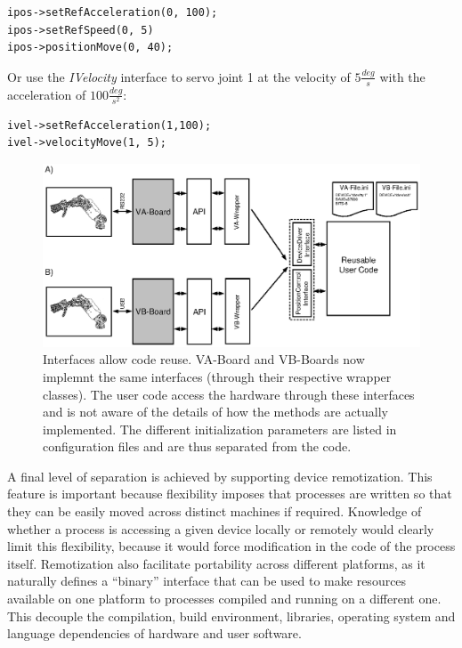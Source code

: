 \begin{verbatim}
ipos->setRefAcceleration(0, 100);
ipos->setRefSpeed(0, 5)
ipos->positionMove(0, 40);
\end{verbatim}

Or use the \emph{IVelocity} interface to servo joint 1 at the velocity of 
$5\frac{deg}{s}$ with the acceleration of $100\frac{deg}{s^2}$:

\begin{verbatim}
ivel->setRefAcceleration(1,100);
ivel->velocityMove(1, 5);
\end{verbatim}

\begin{figure}[tbp]
\centerline{
\includegraphics[width=24cm]{fig-devices2.eps}
}
\caption{Interfaces allow code reuse. VA-Board and VB-Boards now implemnt
the same interfaces (through their respective wrapper classes). The user 
code access the hardware through these interfaces and is not aware of 
the details of how the methods are actually implemented. The different 
initialization parameters are listed in configuration files and are thus 
separated from the code.}\label{fig:devices2}
\end{figure}

A final level of separation is achieved by supporting device remotization. 
This feature is important because flexibility imposes 
that processes are written so that they can be easily moved across distinct machines 
if required. Knowledge of whether a process is accessing a given device locally or 
remotely would clearly limit this flexibility, because it would force modification 
in the code of the process itself. Remotization also facilitate portability 
across different platforms, as it naturally defines a ``binary'' interface that can 
be used to make resources available on one platform to processes compiled and running 
on a different one. This decouple the compilation, build environment, libraries, 
operating system and language dependencies of hardware and user software.

